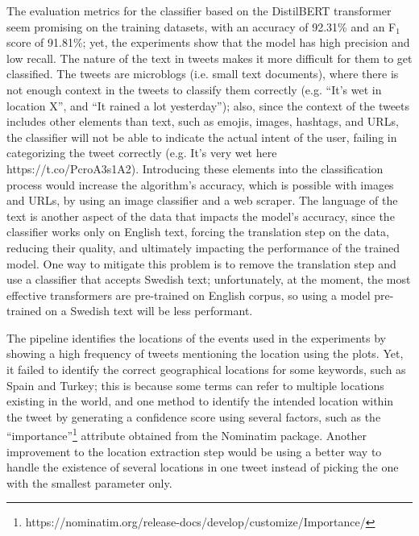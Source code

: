 The evaluation metrics for the classifier based on the DistilBERT transformer seem promising on the
training datasets, with an accuracy of 92.31\% and an F$_{1}$ score of 91.81\%; yet, the experiments
show that the model has high precision and low recall. The nature of the text in tweets makes it
more difficult for them to get classified. The tweets are microblogs (i.e. small text documents),
where there is not enough context in the tweets to classify them correctly (e.g. ``It's wet in
location X'', and ``It rained a lot yesterday''); also, since the context of the tweets includes
other elements than text, such as emojis, images, hashtags, and \ac{URL}s, the classifier will not
be able to indicate the actual intent of the user, failing in categorizing the tweet correctly (e.g.
It's very wet here https://t.co/PcroA3s1A2). Introducing these elements into the classification
process would increase the algorithm's accuracy, which is possible with images and \ac{URL}s, by
using an image classifier and a web scraper. The language of the text is another aspect of the data
that impacts the model's accuracy, since the classifier works only on English text, forcing the
translation step on the data, reducing their quality, and ultimately impacting the performance of
the trained model. One way to mitigate this problem is to remove the translation step and use a
classifier that accepts Swedish text; unfortunately, at the moment, the most effective transformers
are pre-trained on English corpus, so using a model pre-trained on a Swedish text will be less
performant.

The pipeline identifies the locations of the events used in the experiments by showing a high
frequency of tweets mentioning the location using the plots. Yet, it failed to identify the correct
geographical locations for some keywords, such as Spain and Turkey; this is because some terms can
refer to multiple locations existing in the world, and one method to identify the intended location
within the tweet by generating a confidence score using several factors, such as the
``importance''\footnote{https://nominatim.org/release-docs/develop/customize/Importance/} attribute
obtained from the Nominatim package. Another improvement to the location extraction step would be
using a better way to handle the existence of several locations in one tweet instead of picking the
one with the smallest parameter only.

